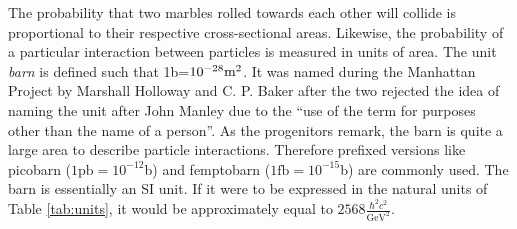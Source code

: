The probability that two marbles rolled towards each other will collide is proportional to their respective cross-sectional areas.
Likewise, the probability of a particular interaction between particles is measured in units of area.
The unit \emph{barn} is defined such that 1b=$10^{-28}\text m^2$.
It was named during the Manhattan Project by Marshall Holloway and C. P. Baker after the two rejected the idea of naming the unit after John Manley due to the ``use of the term for purposes other than the name of a person''. \cite{holloway}
As the progenitors remark, the barn is quite a large area to describe particle interactions. 
Therefore prefixed versions like picobarn ($1\text{pb}=10^{-12}$b) and femptobarn ($1\text{fb}=10^{-15}$b) are commonly used.
The barn is essentially an SI unit. If it were to be expressed in the natural units of Table \ref{tab:units}, it would be approximately equal to $2568\frac{\hbar^2 c^2}{\text{GeV}^2}$.
